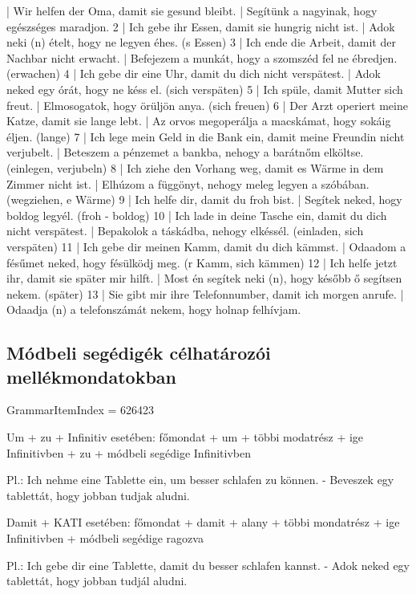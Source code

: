 \documentclass{article}
\newenvironment{desc}{\verbatim}{\endverbatim}
\newenvironment{exmp}{\verbatim}{\endverbatim}
\begin{document}
\begin{exmp}
1 | Wir helfen der Oma, damit sie gesund bleibt. | Segítünk a nagyinak, hogy egészséges maradjon.
2 | Ich gebe ihr Essen, damit sie hungrig nicht ist. | Adok neki (n) ételt, hogy ne legyen éhes. (s Essen)
3 | Ich ende die Arbeit, damit der Nachbar nicht erwacht. | Befejezem a munkát, hogy a szomszéd fel ne ébredjen. (erwachen)
4 | Ich gebe dir eine Uhr, damit du dich nicht verspätest. | Adok neked egy órát, hogy ne késs el. (sich verspäten)
5 | Ich spüle, damit Mutter sich freut. | Elmosogatok, hogy örüljön anya. (sich freuen)
6 | Der Arzt operiert meine Katze, damit sie lange lebt. | Az orvos megoperálja a macskámat, hogy sokáig éljen. (lange)
7 | Ich lege mein Geld in die Bank ein, damit meine Freundin nicht verjubelt. | Beteszem a pénzemet a bankba, nehogy a barátnőm elköltse. (einlegen, verjubeln)
8 | Ich ziehe den Vorhang weg, damit es Wärme in dem Zimmer nicht ist. | Elhúzom a függönyt, nehogy meleg legyen a szóbában. (wegziehen, e Wärme)
9 | Ich helfe dir, damit du froh bist. | Segítek neked, hogy boldog legyél. (froh - boldog)
10 | Ich lade in deine Tasche ein, damit du dich nicht verspätest. | Bepakolok a táskádba, nehogy elkéssél. (einladen, sich verspäten)
11 | Ich gebe dir meinen Kamm, damit du dich kämmst. | Odaadom a fésűmet neked, hogy fésülködj meg. (r Kamm, sich kämmen)
12 | Ich helfe jetzt ihr, damit sie später mir hilft. | Most én segítek neki (n), hogy később ő segítsen nekem. (später)
13 | Sie gibt mir ihre Telefonnumber, damit ich morgen anrufe. | Odaadja (n) a telefonszámát nekem, hogy holnap felhívjam.
\end{exmp}

\subsection{Módbeli segédigék célhatározói mellékmondatokban}

GrammarItemIndex = 626423

\begin{desc}
Um + zu + Infinitiv esetében:
főmondat + um + többi modatrész + ige Infinitivben + zu + módbeli segédige Infinitivben

Pl.: Ich nehme eine Tablette ein, um besser schlafen zu können. - Beveszek egy tablettát, hogy jobban tudjak aludni.

Damit + KATI esetében:
főmondat + damit + alany + többi mondatrész + ige Infinitivben + módbeli segédige ragozva

Pl.: Ich gebe dir eine Tablette, damit du besser schlafen kannst. - Adok neked egy tablettát, hogy jobban tudjál aludni.
\end{desc}
\end{document}
